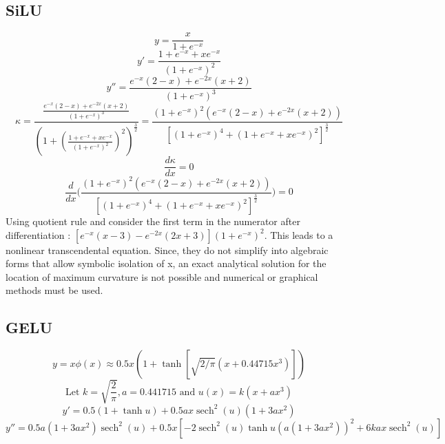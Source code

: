 \documentclass{article}
\begin{document}
\subsection{SiLU}\label{app:silu}

\begin{displaymath}
y = \frac{x}{1 + e^{-x}}
\end{displaymath}
\begin{displaymath}
y' = \frac{1 + e^{-x} + xe^{-x}}{(1 + e^{-x})^2}
\end{displaymath}
\begin{displaymath}
y'' = \frac{e^{-x}(2 - x) + e^{-2x}(x+2)}{(1 + e^{-x})^3}
\end{displaymath}
\begin{displaymath}
\kappa = \frac{\frac{e^{-x}(2 - x) + e^{-2x}(x+2)}{(1 + e^{-x})^3}}{(1 + (\frac{1 + e^{-x} + xe^{-x}}{(1 + e^{-x})^2})^2)^\frac{3}{2}}
= \frac{(1 + e^{-x})^2(e^{-x}(2 - x) + e^{-2x}(x+2))}{[(1 + e^{-x})^4 + (1 + e^{-x} + xe^{-x})^2]^\frac{3}{2}}
\end{displaymath}
\begin{displaymath}
\frac{d \kappa}{dx} = 0
\end{displaymath}
\begin{displaymath}
\frac{d}{dx}\biggr(\frac{(1 + e^{-x})^2(e^{-x}(2 - x) + e^{-2x}(x+2))}{[(1 + e^{-x})^4 + (1 + e^{-x} + xe^{-x})^2]^\frac{3}{2}}\biggr) = 0
\end{displaymath}
Using quotient rule and consider the first term in the numerator after differentiation :
$[e^{-x}(x-3)-e^{-2x}(2x+3)](1+e^{-x})^2$. This leads to a nonlinear 
transcendental equation. Since, they do not simplify into algebraic 
forms that allow symbolic isolation of x, an exact analytical solution for the location of 
maximum curvature is not possible and numerical or graphical methods must be used.

\subsection{GELU}\label{app:gelu}

\begin{displaymath}
y = x \phi(x) \approx 0.5x(1 + \tanh [\sqrt{2 / \pi}(x + 0.44715 x^3)])
\end{displaymath}
\begin{displaymath}
\text{Let }k = \sqrt{\frac{2}{\pi}}, a = 0.441715 \text{ and }u(x) = k(x + ax^3)
\end{displaymath}
\begin{displaymath}
y' = 0.5(1 + \tanh{u}) + 0.5ax\operatorname{sech}^2(u)(1 + 3ax^2)
\end{displaymath}
\begin{displaymath}
y'' = 0.5a(1 + 3ax^2)\operatorname{sech}^2(u) + 0.5x[-2\operatorname{sech}^2(u)\tanh{u}(a(1 + 3ax^2))^2 + 6kax\operatorname{sech}^2(u)]
\end{displaymath}
\end{document}
